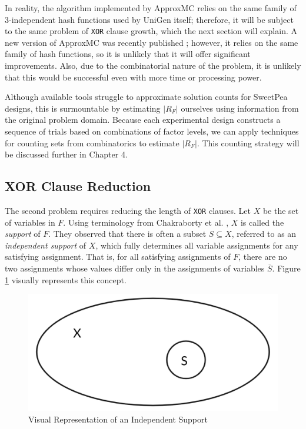 In reality, the algorithm implemented by ApproxMC relies on the same family of 3-independent hash functions used by UniGen itself; therefore, it will be subject to the same problem of \texttt{XOR} clause growth, which the next section will explain. A new version of ApproxMC was recently published \cite{approxmc_SM19}; however, it relies on the same family of hash functions, so it is unlikely that it will offer significant improvements. Also, due to the combinatorial nature of the problem, it is unlikely that this would be successful even with more time or processing power.

Although available tools struggle to approximate solution counts for SweetPea designs, this is surmountable by estimating $|R_F|$ ourselves using information from the original problem domain. Because each experimental design constructs a sequence of trials based on combinations of factor levels, we can apply techniques for counting sets from combinatorics to estimate $|R_F|$. This counting strategy will be discussed further in Chapter 4.

\subsection{XOR Clause Reduction}

The second problem requires reducing the length of \texttt{XOR} clauses. Let $X$ be the set of variables in $F$. Using terminology from Chakraborty et al. \cite{chakraborty_balancing_2014}, $X$ is called the \textit{support} of $F$. They observed that there is often a subset $S \subseteq X$, referred to as an \textit{independent support} of $X$, which fully determines all variable assignments for any satisfying assignment. That is, for all satisfying assignments of $F$, there are no two assignments whose values differ only in the assignments of variables $\overline{S}$. Figure \ref{fig:ind_support} visually represents this concept.

\begin{figure}[b]
\centering
\centerline{\includegraphics[origin=c,width=12cm]{../figures/independent-support.png}}
\caption{Visual Representation of an Independent Support}
\label{fig:ind_support}
\end{figure}

